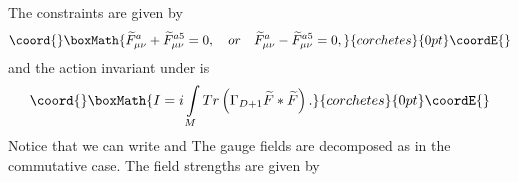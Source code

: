 \documentclass[a4paper,a4paper]{article}
\begin{document}
The constraints are given by
\[\coord{}\boxMath{
\widetilde{F}_{\mu\nu}^{a}+\widetilde{F}_{\mu\nu}^{a5}=0,\quad or\quad
\widetilde{F}_{\mu\nu}^{a}-\widetilde{F}_{\mu\nu}^{a5}=0,
}{corchetes}{0pt}\coordE{}\]
and the action invariant under \coordHE{} is
\[\coord{}\boxMath{
I=i\int\limits_{M}Tr\left(  \Gamma_{D+1}\widetilde{F}\ast\widetilde{F}\right)
.
}{corchetes}{0pt}\coordE{}\]
Notice that we can write \coordHE{} and \coordHE{}  \coordHE{} The gauge
fields \coordHE{} are decomposed as in the commutative case. The
field strengths are given by
\end{document}
